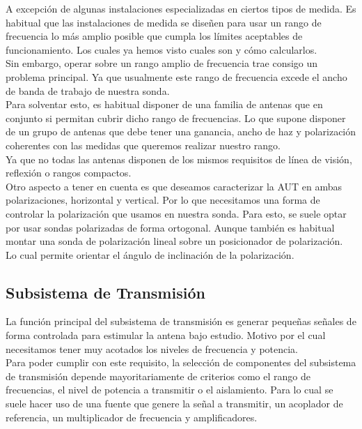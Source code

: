 \documentclass{article}
\begin{document}
A excepción de algunas instalaciones especializadas en ciertos tipos de medida. Es habitual que las instalaciones de medida se diseñen para usar un rango de frecuencia lo más amplio posible que cumpla los límites aceptables de funcionamiento. Los cuales ya hemos visto cuales son y cómo calcularlos.
\\

Sin embargo, operar sobre un rango amplio de frecuencia trae consigo un problema principal. Ya que usualmente este rango de frecuencia excede el ancho de banda de trabajo de nuestra sonda. 
\\

Para solventar esto, es habitual disponer de una familia de antenas que en conjunto si permitan cubrir dicho rango de frecuencias. Lo que supone disponer de un grupo de antenas que debe tener una ganancia, ancho de haz y polarización coherentes con las medidas que queremos realizar nuestro rango.\\
Ya que no todas las antenas disponen de los mismos requisitos de línea de visión, reflexión o rangos compactos.
\\

Otro aspecto a tener en cuenta es que deseamos caracterizar la AUT en ambas polarizaciones, horizontal y vertical. Por lo que necesitamos una forma de controlar la polarización que usamos en nuestra sonda. Para esto, se suele optar por usar sondas polarizadas de forma ortogonal. Aunque también es habitual montar una sonda de polarización lineal sobre un posicionador de polarización. Lo cual permite orientar el ángulo de inclinación de la polarización.

\newpage
\subsection{Subsistema de Transmisión}

La función principal del subsistema de transmisión es generar pequeñas señales de forma controlada para estimular la antena bajo estudio. Motivo por el cual necesitamos tener muy acotados los niveles de frecuencia y potencia. 
\\

Para poder cumplir con este requisito, la selección de componentes del subsistema de transmisión depende mayoritariamente de criterios como el rango de frecuencias, el nivel de potencia a transmitir o el aislamiento. Para lo cual se suele hacer uso de una fuente que genere la señal a transmitir, un acoplador de referencia, un multiplicador de frecuencia y amplificadores. 
\end{document}
